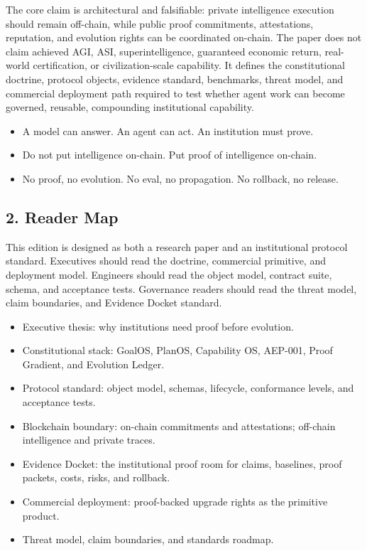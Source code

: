 \documentclass[
]{article}
\providecommand{\tightlist}{%
  \setlength{\itemsep}{0pt}\setlength{\parskip}{0pt}}
\begin{document}
The core claim is architectural and falsifiable: private intelligence
execution should remain off-chain, while public proof commitments,
attestations, reputation, and evolution rights can be coordinated
on-chain. The paper does not claim achieved AGI, ASI, superintelligence,
guaranteed economic return, real-world certification, or
civilization-scale capability. It defines the constitutional doctrine,
protocol objects, evidence standard, benchmarks, threat model, and
commercial deployment path required to test whether agent work can
become governed, reusable, compounding institutional capability.

\begin{itemize}
\tightlist
\item
  A model can answer. An agent can act. An institution must prove.
\item
  Do not put intelligence on-chain. Put proof of intelligence on-chain.
\item
  No proof, no evolution. No eval, no propagation. No rollback, no
  release.
\end{itemize}

\subsection{2. Reader Map}\label{reader-map}

This edition is designed as both a research paper and an institutional
protocol standard. Executives should read the doctrine, commercial
primitive, and deployment model. Engineers should read the object model,
contract suite, schema, and acceptance tests. Governance readers should
read the threat model, claim boundaries, and Evidence Docket standard.

\begin{itemize}
\tightlist
\item
  Executive thesis: why institutions need proof before evolution.
\item
  Constitutional stack: GoalOS, PlanOS, Capability OS, AEP-001, Proof
  Gradient, and Evolution Ledger.
\item
  Protocol standard: object model, schemas, lifecycle, conformance
  levels, and acceptance tests.
\item
  Blockchain boundary: on-chain commitments and attestations; off-chain
  intelligence and private traces.
\item
  Evidence Docket: the institutional proof room for claims, baselines,
  proof packets, costs, risks, and rollback.
\item
  Commercial deployment: proof-backed upgrade rights as the primitive
  product.
\item
  Threat model, claim boundaries, and standards roadmap.
\end{itemize}
\end{document}

